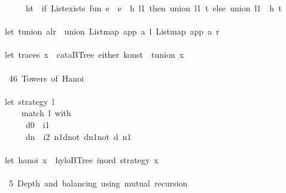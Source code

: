 \documentclass[a4paper]{article}
\begin{document}
\begin{tabbing}
\ttfamily ~~~~~~ht~~if~Listexists~fun~e~~e~~h~l1~then~union~l1~t~else~union~l1~~h~t\\
\ttfamily ~\\
\ttfamily ~let~tunion~alr~~union~Listmap~app~a~l~Listmap~app~a~r\\
\ttfamily ~\\
\ttfamily ~let~traces~x~~cataBTree~either~konst~~tunion~x\\
\ttfamily ~\\
\ttfamily ~~46~Towers~of~Hanoi~\\
\ttfamily ~\\
\ttfamily ~let~strategy~l~\\
\ttfamily ~~~~~match~l~with\\
\ttfamily ~~~~~~d0~~i1~\\
\ttfamily ~~~~~~dn~~i2~n1dnot~dn1not~d~n1\\
\ttfamily ~\\
\ttfamily ~let~hanoi~x~~hyloBTree~inord~strategy~x\\
\ttfamily ~\\
\ttfamily ~~5~Depth~and~balancing~using~mutual~recursion~\\

\end{tabbing}
\end{document}
